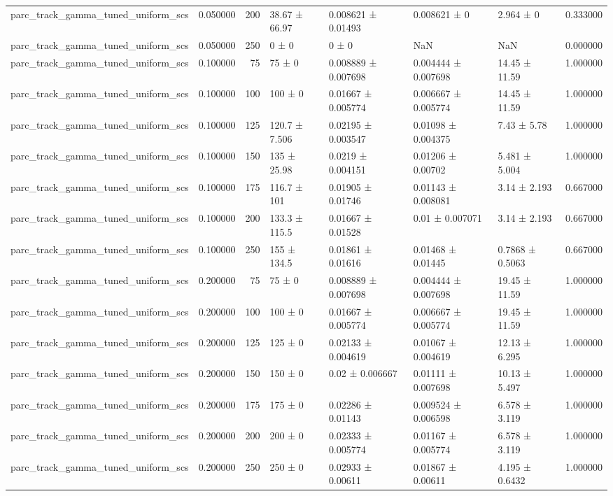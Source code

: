 \begin{tabular}{lrrllllr}
parc_track_gamma_tuned_uniform_scs & 0.050000 & 200 & 38.67 ± 66.97 & 0.008621 ± 0.01493 & 0.008621 ± 0 & 2.964 ± 0 & 0.333000 \\
parc_track_gamma_tuned_uniform_scs & 0.050000 & 250 & 0 ± 0 & 0 ± 0 & NaN & NaN & 0.000000 \\
parc_track_gamma_tuned_uniform_scs & 0.100000 & 75 & 75 ± 0 & 0.008889 ± 0.007698 & 0.004444 ± 0.007698 & 14.45 ± 11.59 & 1.000000 \\
parc_track_gamma_tuned_uniform_scs & 0.100000 & 100 & 100 ± 0 & 0.01667 ± 0.005774 & 0.006667 ± 0.005774 & 14.45 ± 11.59 & 1.000000 \\
parc_track_gamma_tuned_uniform_scs & 0.100000 & 125 & 120.7 ± 7.506 & 0.02195 ± 0.003547 & 0.01098 ± 0.004375 & 7.43 ± 5.78 & 1.000000 \\
parc_track_gamma_tuned_uniform_scs & 0.100000 & 150 & 135 ± 25.98 & 0.0219 ± 0.004151 & 0.01206 ± 0.00702 & 5.481 ± 5.004 & 1.000000 \\
parc_track_gamma_tuned_uniform_scs & 0.100000 & 175 & 116.7 ± 101 & 0.01905 ± 0.01746 & 0.01143 ± 0.008081 & 3.14 ± 2.193 & 0.667000 \\
parc_track_gamma_tuned_uniform_scs & 0.100000 & 200 & 133.3 ± 115.5 & 0.01667 ± 0.01528 & 0.01 ± 0.007071 & 3.14 ± 2.193 & 0.667000 \\
parc_track_gamma_tuned_uniform_scs & 0.100000 & 250 & 155 ± 134.5 & 0.01861 ± 0.01616 & 0.01468 ± 0.01445 & 0.7868 ± 0.5063 & 0.667000 \\
parc_track_gamma_tuned_uniform_scs & 0.200000 & 75 & 75 ± 0 & 0.008889 ± 0.007698 & 0.004444 ± 0.007698 & 19.45 ± 11.59 & 1.000000 \\
parc_track_gamma_tuned_uniform_scs & 0.200000 & 100 & 100 ± 0 & 0.01667 ± 0.005774 & 0.006667 ± 0.005774 & 19.45 ± 11.59 & 1.000000 \\
parc_track_gamma_tuned_uniform_scs & 0.200000 & 125 & 125 ± 0 & 0.02133 ± 0.004619 & 0.01067 ± 0.004619 & 12.13 ± 6.295 & 1.000000 \\
parc_track_gamma_tuned_uniform_scs & 0.200000 & 150 & 150 ± 0 & 0.02 ± 0.006667 & 0.01111 ± 0.007698 & 10.13 ± 5.497 & 1.000000 \\
parc_track_gamma_tuned_uniform_scs & 0.200000 & 175 & 175 ± 0 & 0.02286 ± 0.01143 & 0.009524 ± 0.006598 & 6.578 ± 3.119 & 1.000000 \\
parc_track_gamma_tuned_uniform_scs & 0.200000 & 200 & 200 ± 0 & 0.02333 ± 0.005774 & 0.01167 ± 0.005774 & 6.578 ± 3.119 & 1.000000 \\
parc_track_gamma_tuned_uniform_scs & 0.200000 & 250 & 250 ± 0 & 0.02933 ± 0.00611 & 0.01867 ± 0.00611 & 4.195 ± 0.6432 & 1.000000 \\

\end{tabular}

